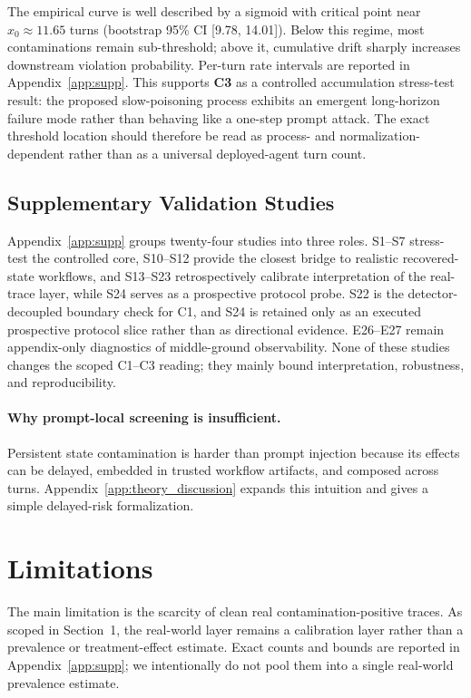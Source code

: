 The empirical curve is well described by a sigmoid with critical point near $x_0 \approx 11.65$ turns (bootstrap 95\% CI [9.78, 14.01]). Below this regime, most contaminations remain sub-threshold; above it, cumulative drift sharply increases downstream violation probability. Per-turn rate intervals are reported in Appendix~\ref{app:supp}. This supports \textbf{C3} as a controlled accumulation stress-test result: the proposed slow-poisoning process exhibits an emergent long-horizon failure mode rather than behaving like a one-step prompt attack. The exact threshold location should therefore be read as process- and normalization-dependent rather than as a universal deployed-agent turn count.

\subsection{Supplementary Validation Studies}
\label{sec:exp_supp}

Appendix~\ref{app:supp} groups twenty-four studies into three roles. S1--S7 stress-test the controlled core, S10--S12 provide the closest bridge to realistic recovered-state workflows, and S13--S23 retrospectively calibrate interpretation of the real-trace layer, while S24 serves as a prospective protocol probe. S22 is the detector-decoupled boundary check for C1, and S24 is retained only as an executed prospective protocol slice rather than as directional evidence. E26--E27 remain appendix-only diagnostics of middle-ground observability. None of these studies changes the scoped C1--C3 reading; they mainly bound interpretation, robustness, and reproducibility.

\paragraph{Why prompt-local screening is insufficient.} Persistent state contamination is harder than prompt injection because its effects can be delayed, embedded in trusted workflow artifacts, and composed across turns. Appendix~\ref{app:theory_discussion} expands this intuition and gives a simple delayed-risk formalization.

\section{Limitations}

The main limitation is the scarcity of clean real contamination-positive traces. As scoped in Section~1, the real-world layer remains a calibration layer rather than a prevalence or treatment-effect estimate. Exact counts and bounds are reported in Appendix~\ref{app:supp}; we intentionally do not pool them into a single real-world prevalence estimate.


